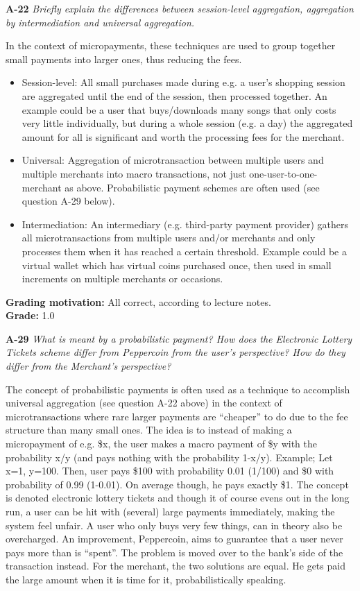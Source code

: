 \documentclass[a4paper]{article}
\newcommand{\Q}[2]{
  \vspace{10pt} \textbf{#1} \textit{#2}
 }
\newcommand{\A}[1]{ #1 }
\newcommand{\Grade}[2]{ 
  \textbf{Grading motivation:} #2 \\ 
  \hspace*{\fill} \textbf{Grade:} #1 
}
\begin{document}
\Q{A-22} {Briefly explain the differences between session-level aggregation,
aggregation by intermediation and universal aggregation.}

\A{
  In the context of micropayments, these techniques are used to group together small
  payments into larger ones, thus reducing the fees.
  \begin{itemize}
    \item{Session-level: All small purchases made during e.g. a user’s shopping session are
    aggregated until the end of the session, then processed together. An example could be
    a user that buys/downloads many songs that only costs very little individually, but during
    a whole session (e.g. a day) the aggregated amount for all is significant and worth the
    processing fees for the merchant.}
   \item{Universal: Aggregation of microtransaction between multiple users and multiple
    merchants into macro transactions, not just one-user-to-one-merchant as above.
    Probabilistic payment schemes are often used (see question A-29 below).}
   \item{Intermediation: An intermediary (e.g. third-party payment provider) gathers all
    microtransactions from multiple users and/or merchants and only processes them when
    it has reached a certain threshold. Example could be a virtual wallet which has virtual
    coins purchased once, then used in small increments on multiple merchants or
    occasions.}
  \end{itemize}
}

\Grade{1.0}{
  All correct, according to lecture notes.
}

\Q{A-29} {What  is  meant  by  a  probabilistic  payment?   How  does  the  
Electronic  Lottery  Tickets  scheme  differ from Peppercoin from the user's perspective?
How do they differ from the Merchant's perspective?}

\A{
  The concept of probabilistic payments is often used as a technique to accomplish
  universal aggregation (see question A-22 above) in the context of microtransactions where rare
  larger payments are “cheaper” to do due to the fee structure than many small ones. The idea is
  to instead of making a micropayment of e.g. \$x, the user makes a macro payment of \$y with the
  probability x/y (and pays nothing with the probability 1-x/y). Example; Let x=1, y=100. Then,
  user pays \$100 with probability 0.01 (1/100) and \$0 with probability of 0.99 (1-0.01). On average
  though, he pays exactly \$1.
  The concept is denoted electronic lottery tickets and though it of course evens out in the long
  run, a user can be hit with (several) large payments immediately, making the system feel unfair.
  A user who only buys very few things, can in theory also be overcharged. An improvement,
  Peppercoin, aims to guarantee that a user never pays more than is “spent”. The problem is
  moved over to the bank’s side of the transaction instead. For the merchant, the two solutions
  are equal. He gets paid the large amount when it is time for it, probabilistically speaking.
}
\end{document}
